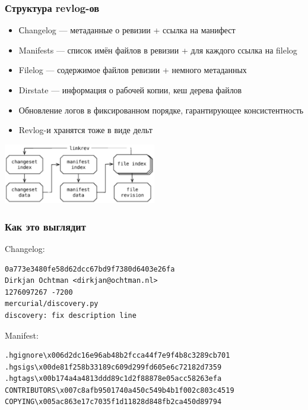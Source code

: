 \documentclass{../mcsslides}
\begin{document}
    \begin{frame}
        \frametitle{Структура revlog-ов}
        \begin{itemize}
            \item Сhangelog --- метаданные о ревизии + ссылка на манифест
            \item Manifests --- список имён файлов в ревизии + для каждого ссылка на filelog
            \item Filelog --- содержимое файлов ревизии + немного метаданных
            \item Dirstate --- информация о рабочей копии, кеш дерева файлов
            \item Обновление логов в фиксированном порядке, гарантирующее консистентность
            \item Revlog-и хранятся тоже в виде дельт
        \end{itemize}
        \begin{center}
            \includegraphics[width=0.5\textwidth]{mercurialLogStructure.png}
        \end{center}
    \end{frame}

    \begin{frame}[fragile]
        \frametitle{Как это выглядит}
        Changelog:
        \begin{verbatim}
0a773e3480fe58d62dcc67bd9f7380d6403e26fa
Dirkjan Ochtman <dirkjan@ochtman.nl>
1276097267 -7200
mercurial/discovery.py
discovery: fix description line
        \end{verbatim}
        \vspace{3mm}
        Manifest:
        \begin{verbatim}
.hgignore\x006d2dc16e96ab48b2fcca44f7e9f4b8c3289cb701
.hgsigs\x00de81f258b33189c609d299fd605e6c72182d7359
.hgtags\x00b174a4a4813ddd89c1d2f88878e05acc58263efa
CONTRIBUTORS\x007c8afb9501740a450c549b4b1f002c803c4519
COPYING\x005ac863e17c7035f1d11828d848fb2ca450d89794
        \end{verbatim}
    \end{frame}
\end{document}
